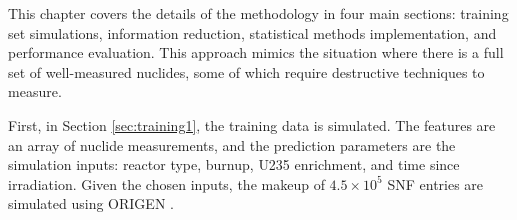 %

This chapter covers the details of the methodology in four main sections:
training set simulations, information reduction, statistical methods
implementation, and performance evaluation. This approach mimics the situation
where there is a full set of well-measured nuclides, some of which require
destructive techniques to measure. 

First, in Section \ref{sec:training1}, the training data is simulated. The
features are an array of nuclide measurements, and the prediction parameters
are the simulation inputs: reactor type, burnup, \gls{U235} enrichment, and
time since irradiation.  Given the chosen inputs, the makeup of $4.5 \times
10^5$ \gls{SNF} entries are simulated using \gls{ORIGEN} \cite{scale, origen,
origenarp}.

